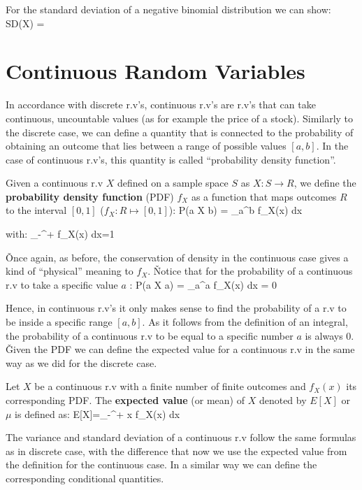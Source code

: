 For the standard deviation of a negative binomial distribution we can show:
\bse
SD(X) = 
\ese

\section{Continuous Random Variables}

In accordance with discrete r.v's, continuous r.v's are r.v's that can take continuous, uncountable values (as for
example the price of a stock). Similarly to the discrete case, we can define a quantity that is connected to the
probability of obtaining an outcome that lies between a range of possible values $[a,b]$. In the case of continuous
r.v's, this quantity is called ``probability density function''.

Given a continuous r.v $X$ defined on a sample space $S$ as $X \colon S \to R$, we define the \textbf{probability
density function} (PDF) $f_{X}$ as a function that maps outcomes $R$ to the interval $[0,1]$ ($f_{X}:R\mapsto [0,1]$):
\bse
P(a \leq X \leq b) = \int_{a}^{b} f_{X}(x) dx
\ese

with:
\bse
\int_{-\infty}^{+\infty} f_{X}(x) dx=1
\ese
\ed

\v

Once again, as before, the conservation of density in the continuous case gives a kind of ``physical'' meaning to
$f_{X}$. \v

Notice that for the probability of a continuous r.v to take a specific value
$a$ :
\bse
P(a \leq X \leq a) = \int_{a}^{a} f_{X}(x) dx = 0
\ese

Hence, in continuous r.v's it only makes sense to find the probability of a r.v to be inside a specific range $[a,b]$.
As it follows from the definition of an integral, the probability of a continuous r.v to be equal to a specific
number $a$ is always 0. \v

Given the PDF we can define the expected value for a continuous r.v in the same way as we did for the discrete case.

Let $X$ be a continuous r.v with a finite number of finite outcomes and $f_{X}(x)$ its corresponding PDF. The
\textbf{expected value} (or mean) of $X$ denoted by $E[X]$ or $\mu$ is defined as:
\bse
E[X]=\int_{-\infty}^{+\infty} x f_{X}(x) dx
\ese
\ed

The variance and standard deviation of a continuous r.v follow the same formulas as in discrete case, with the
difference that now we use the expected value from the definition for the continuous case. In a similar way we can
define the corresponding conditional quantities.

